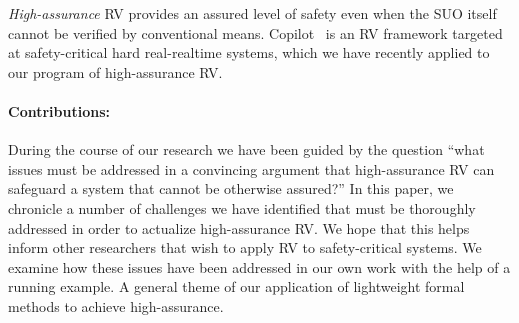 \emph{High-assurance} RV provides an assured level of safety even when
the SUO itself cannot be verified  by conventional
means. Copilot~\cite{copilot, pike-isse-13} is an RV framework
targeted at safety-critical hard real-realtime systems, which we have
recently applied to our program of high-assurance RV.  


\paragraph{Contributions:} During the course of our research we have
been guided by the question ``what
 issues must be  addressed in a convincing argument  that  high-assurance RV can safeguard a
system that cannot be otherwise assured?''  In this paper, we
chronicle a number of  challenges we have identified that must be
thoroughly addressed in order to actualize high-assurance RV.  We hope
that this helps inform other researchers that wish to apply RV to
safety-critical systems. We examine  how  these issues have been
addressed in our own work   with the help of a running example. A general theme of our
application of lightweight formal methods to achieve
high-assurance.   



